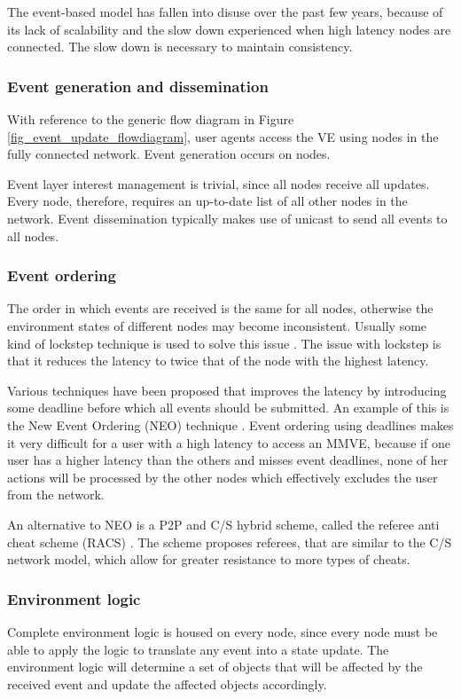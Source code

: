 The event-based model has fallen into disuse over the past few years, because of its lack of scalability and the slow down experienced when high latency nodes are connected. The slow down is necessary to maintain consistency.

\subsubsection{Event generation and dissemination}

With reference to the generic flow diagram in Figure \ref{fig_event_update_flowdiagram}, user agents access the VE using nodes in the fully connected network. Event generation occurs on nodes.

Event layer interest management is trivial, since all nodes receive all updates. Every node, therefore, requires an up-to-date list of all other nodes in the network. Event dissemination typically makes use of unicast to send all events to all nodes.

\subsubsection{Event ordering}
The order in which events are received is the same for all nodes, otherwise the environment states of different nodes may become inconsistent.
Usually some kind of lockstep technique is used to solve this issue \cite{pessimistic_lock_step}. The issue with lockstep is that it reduces the latency to twice that of the node with the highest latency.

Various techniques have been proposed that improves the latency by introducing some deadline before which all events should be submitted. An example of this is the New Event Ordering (NEO) technique \cite{cheat_proof_event_ordering}. Event ordering using deadlines makes it very difficult for a user with a high latency to access an MMVE, because if one user has a higher latency than the others and misses event deadlines, none of her actions will be processed by the other nodes which effectively excludes the user from the network.

An alternative to NEO is a P2P and C/S hybrid scheme, called the referee anti cheat scheme (RACS) \cite{cheating_taxonomy}. The scheme proposes referees, that are similar to the C/S network model, which allow for greater resistance to more types of cheats.

\subsubsection{Environment logic}
Complete environment logic is housed on every node, since every node must be able to apply the logic to translate any event into a state update. The environment logic will determine a set of objects that will be affected by the received event and update the affected objects accordingly.

